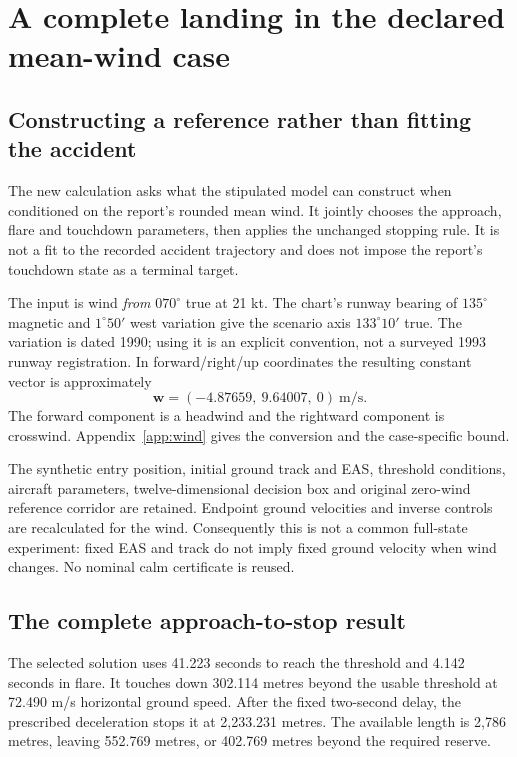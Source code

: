 \section{A complete landing in the declared mean-wind case}
\label{sec:wind}
\subsection{Constructing a reference rather than fitting the accident}
The new calculation asks what the stipulated model can construct when conditioned on the report's rounded mean wind. It jointly chooses the approach, flare and touchdown parameters, then applies the unchanged stopping rule. It is not a fit to the recorded accident trajectory and does not impose the report's touchdown state as a terminal target.

The input is wind \emph{from} $070^\circ$ true at 21 kt. The chart's runway bearing of $135^\circ$ magnetic and $1^\circ50'$ west variation give the scenario axis $133^\circ10'$ true. The variation is dated 1990; using it is an explicit convention, not a surveyed 1993 runway registration. In forward/right/up coordinates the resulting constant vector is approximately
\begin{equation}
\mathbf w=(-4.87659,\ 9.64007,\ 0)\ \mathrm{m/s}.
\end{equation}
The forward component is a headwind and the rightward component is crosswind. Appendix~\ref{app:wind} gives the conversion and the case-specific bound.

The synthetic entry position, initial ground track and EAS, threshold conditions, aircraft parameters, twelve-dimensional decision box and original zero-wind reference corridor are retained. Endpoint ground velocities and inverse controls are recalculated for the wind. Consequently this is not a common full-state experiment: fixed EAS and track do not imply fixed ground velocity when wind changes. No nominal calm certificate is reused.

\subsection{The complete approach-to-stop result}
The selected solution uses 41.223 seconds to reach the threshold and 4.142 seconds in flare. It touches down 302.114 metres beyond the usable threshold at 72.490 m/s horizontal ground speed. After the fixed two-second delay, the prescribed deceleration stops it at 2,233.231 metres. The available length is 2,786 metres, leaving 552.769 metres, or 402.769 metres beyond the required reserve.

